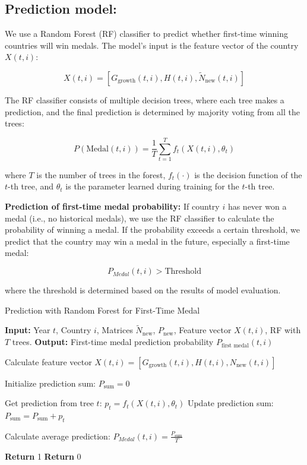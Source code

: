 \documentclass{mcmthesis}
\begin{document}
	
	
	
	
	
	\subsection{Prediction model:}  
	We use a Random Forest (RF) classifier to predict whether first-time winning countries will win medals. The model’s input is the feature vector of the country \( X(t,i) \):
	
	\[
	X(t,i) = [G_{\text{growth}}(t,i), H(t,i), \tilde{N}_{\text{new}}(t,i)]
	\]
	
	The RF classifier consists of multiple decision trees, where each tree makes a prediction, and the final prediction is determined by majority voting from all the trees:
	
	\[
	P(\text{Medal}(t,i)) = \frac{1}{T} \sum_{t=1}^{T} f_t(X(t,i), \theta_t)
	\]
	
	where \( T \) is the number of trees in the forest, \( f_t(\cdot) \) is the decision function of the \( t \)-th tree, and \( \theta_t \) is the parameter learned during training for the \( t \)-th tree.
	
	\textbf{Prediction of first-time medal probability:}  
	If country \( i \) has never won a medal (i.e., no historical medals), we use the RF classifier to calculate the probability of winning a medal. If the probability exceeds a certain threshold, we predict that the country may win a medal in the future, especially a first-time medal:
	
	\[
	P_{Medal}(t,i) > \text{Threshold}
	\]
	
	where the threshold is determined based on the results of model evaluation.
	\begin{algorithm}
		\caption{Prediction with Random Forest for First-Time Medal}
		\begin{algorithmic}[1]
			\State \textbf{Input:} Year \( t \), Country \( i \), Matrices \( \tilde{N}_{\text{new}} \), \( P_{\text{new}} \), Feature vector \( X(t,i) \), RF with \( T \) trees.
			\State \textbf{Output:} First-time medal prediction probability \( P_{\text{first medal}}(t,i) \)
			
			\State Calculate feature vector \( X(t,i) = [G_{\text{growth}}(t,i), H(t,i), N_{\text{new}}(t,i)] \)
			
			\State Initialize prediction sum: \( P_{\text{sum}} = 0 \)
			
			\State Get prediction from tree \( t \): \( p_t = f_t(X(t,i), \theta_t) \)
			\State Update prediction sum: \( P_{\text{sum}} = P_{\text{sum}} + p_t \)
			\EndFor
			
			\State Calculate average prediction: \( P_{Medal}(t,i)  = \frac{P_{\text{sum}}}{T} \)
			
			\State \textbf{Return} 1 
			\Else
			\State \textbf{Return} 0 
			\EndIf
		\end{algorithmic}
	\end{algorithm}
	
\end{document}

